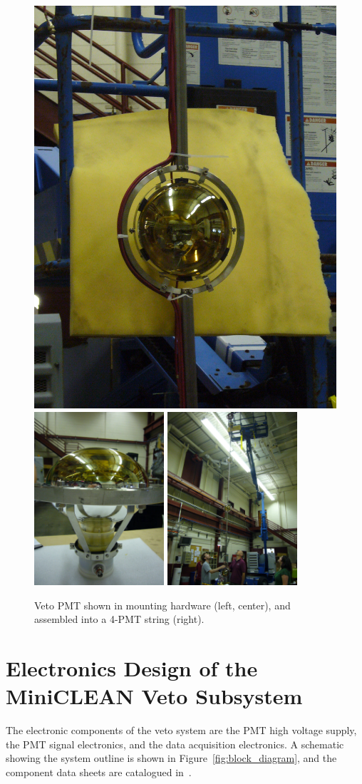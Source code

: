 \documentclass{JINST}
\begin{document}
\begin{figure}[ht]
\begin{center}
\includegraphics[width=2.in]{graphics/singlepmtmounted1.jpg}
\includegraphics[width=1.9in]{graphics/singlepmtmounted2.jpg}
\includegraphics[width=1.9in]{graphics/pmtstring.jpg}
\caption{Veto PMT shown in mounting hardware (left, center), and assembled into a 4-PMT string (right).
\label{fig:vetopmtmountpic}}
\end{center}
\end{figure}


\section{Electronics Design of the MiniCLEAN Veto Subsystem}
\label{sec:electronics_design}
%
The electronic components of the veto system are the PMT high voltage supply, the PMT signal electronics, and the data acquisition electronics.  A schematic showing the system outline is shown in Figure~\ref{fig:block_diagram}, and the component data sheets are catalogued in~\cite{ref:vetocomponentdatasheets}.
\end{document}
